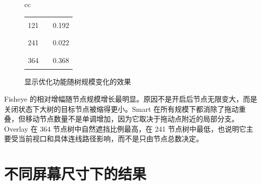 \documentclass[11pt,a4paper,oneside,extrafontsizes]{memoir}
\begin{document}
\begin{center}
\begin{figure}[htbp]
\begin{tabular}{cc}
\begin{minipage}[t]{0.46\textwidth}
\begin{tabular}{@{}r l r@{}}
121 & \textcolor{blue!70!black}{\rule{0.1043\textwidth}{1.1ex}} & 0.192 \\
241 & \textcolor{blue!70!black}{\rule{0.0180\textwidth}{1.1ex}} & 0.022 \\
364 & \textcolor{blue!70!black}{\rule{0.2000\textwidth}{1.1ex}} & 0.368 \\
\end{tabular}
\end{minipage}
\end{tabular}
\caption{显示优化功能随树规模变化的效果}
\label{fig:display-size-metrics}
\end{figure}

\end{center}

Fisheye 的相对增幅随节点规模增长最明显。原因不是开启后节点无限变大，而是关闭状态下大树的目标节点被缩得更小。Smart 在所有规模下都消除了拖动重叠，但移动节点数量不是单调增加，因为它取决于拖动点附近的局部分支。Overlay 在 364 节点树中自然遮挡比例最高，在 241 节点树中最低，也说明它主要受当前视口和具体连线路径影响，而不是只由节点总数决定。

\section{不同屏幕尺寸下的结果}
\end{document}
